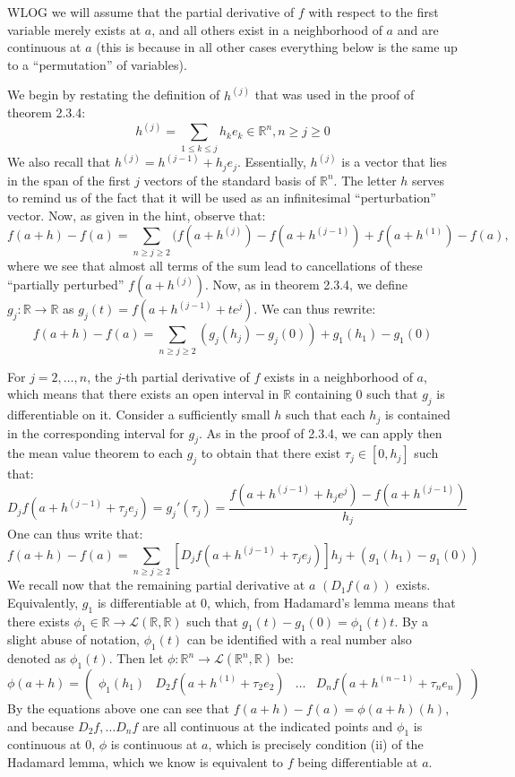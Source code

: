 \begin{solution}

    WLOG we will assume that the partial derivative of $f$ with respect to the first variable merely exists at $a$, and all others exist in a neighborhood of $a$ and are continuous at $a$ (this is because in all other cases everything below is the same up to a ``permutation'' of variables).
    
    We begin by restating the definition of $h^{(j)}$ that was used in the proof of theorem 2.3.4:
    $$h^{(j)} = \sum_{1 \leq k \leq j} h_k e_k \in \mathbb{R}^n, n \geq j \geq 0$$
    We also recall that $h^{(j)} = h^{(j-1)} + h_j e_j$.
    Essentially, $h^{(j)}$ is a vector that lies in the span of the first $j$ vectors of the standard basis of $\mathbb{R}^n$.
    The letter $h$ serves to remind us of the fact that it will be used as an infinitesimal ``perturbation'' vector.
    Now, as given in the hint, observe that:
    $$f(a + h) - f(a) = \sum_{n \geq j \geq 2} (f(a + h^{(j)}) - f(a + h^{(j-1)}) + f(a + h^{(1)}) - f(a),$$
    where we see that almost all terms of the sum lead to cancellations of these ``partially perturbed'' $f(a + h^{(j)})$. 
    Now, as in theorem 2.3.4, we define $g_j: \mathbb{R} \rightarrow \mathbb{R}$ as $g_j(t) = f(a + h^{(j-1)} + te^j)$.
    We can thus rewrite:
    $$f(a + h) - f(a) = \sum_{n \geq j \geq 2} (g_j(h_j) - g_j(0)) + g_1(h_1) - g_1(0)$$

    For $j=2, \ldots, n$, the $j$-th partial derivative of $f$ exists in a neighborhood of $a$, which means that there exists an open interval in $\mathbb{R}$ containing 0 such that $g_j$ is differentiable on it.
    Consider a sufficiently small $h$ such that each $h_j$ is contained in the corresponding interval for $g_j$.
    As in the proof of 2.3.4, we can apply then the mean value theorem to each $g_j$ to obtain that there exist $\tau_j \in [0, h_j]$  such that:
    $$D_j f(a + h^{(j - 1)} + \tau_j e_j) = g_j'(\tau_j) = \frac{f(a + h^{(j-1)} + h_je^j) - f(a + h^{(j-1)})}{h_j}$$
    One can thus write that:
    $$f(a + h) - f(a) = \sum_{n \geq j \geq 2} [D_j f(a + h^{(j-1)} + \tau_j e_j)] h_j + (g_1(h_1) - g_1(0))$$
    We recall now that the remaining partial derivative at $a$ $(D_1 f(a))$ exists.
    Equivalently, $g_1$ is differentiable at 0, which, from Hadamard's lemma means that there exists $\phi_1 \in \mathbb{R} \rightarrow \mathcal{L}(\mathbb{R}, \mathbb{R})$ such that $g_1(t) - g_1(0) = \phi_1(t)t$.
    By a slight abuse of notation, $\phi_1(t)$ can be identified with a real number also denoted as $\phi_1(t)$.
    Then let $\phi: \mathbb{R}^n \rightarrow \mathcal{L}(\mathbb{R}^n, \mathbb{R})$ be:
    $$\phi(a + h) = \begin{pmatrix}
        \phi_1(h_1) & D_2 f(a + h^{(1)} + \tau_2 e_2) & \ldots & D_n f(a + h^{(n-1)} + \tau_n e_n)
    \end{pmatrix}$$
    By the equations above one can see that $f(a+h) - f(a) = \phi(a + h)(h)$, and because $D_2 f, \ldots D_n f$ are all continuous at the indicated points and $\phi_1$ is continuous at 0, $\phi$ is continuous at $a$, which is precisely condition (ii) of the Hadamard lemma, which we know is equivalent to $f$ being differentiable at $a$.
    

\end{solution}
